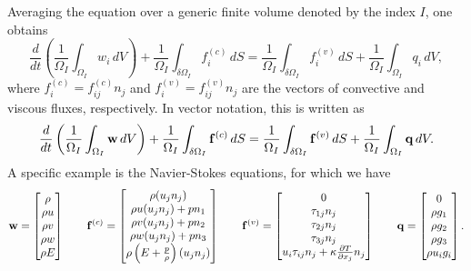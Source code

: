 \documentclass[oneside,a4paper,11pt]{report}
\begin{document}
Averaging the equation over a generic finite volume denoted by the index $I$, one obtains
\begin{equation}
\frac{d}{d t} \left ( \frac{1}{\Omega_I} \int_{\Omega_I} w_i \, dV \right)+  \frac{1}{\Omega_I} \int_{\delta \Omega_I} f^{(c)}_i \,dS = \frac{1}{\Omega_I} \int_{\delta \Omega_I} f^{(v)}_i \, dS + \frac{1}{\Omega_I} \int_{\Omega_I} q_i \,dV,
\end{equation}
where $f^{(c)}_i = f^{(c)}_{ij} n_j$ and $f^{(v)}_i = f^{(v)}_{ij} n_j$ are the vectors of convective and viscous fluxes, respectively. In vector notation, this is written as
\begin{equation}
\frac{d }{d t} \left ( \frac{1}{\Omega_I} \int_{\Omega_I} \mathbf{w} \,dV \right) +  \frac{1}{\Omega_I} \int_{\delta \Omega_I} \mathbf{f}^{(c)} \,dS = \frac{1}{\Omega_I} \int_{\delta \Omega_I} \mathbf{f}^{(v)} \, dS + \frac{1}{\Omega_I} \int_{\Omega_I} \mathbf{q} \,dV.
\end{equation}
A specific example is the Navier-Stokes equations, for which we have
\begin{equation}
\mathbf{w} = \begin{bmatrix} \rho \\ \rho u \\ \rho v \\ \rho w \\ \rho E \end{bmatrix}  \qquad
\mathbf{f}^{(c)} = \begin{bmatrix} \rho (u_j n_j) \\ \rho u (u_j n_j) + p n_1 \\ \rho v (u_j n_j) + p n_2 \\ \rho w (u_j n_j) + p n_3 \\ \rho \left (E + \frac{p}{\rho} \right) (u_j n_j) \end{bmatrix} \qquad
\mathbf{f}^{(v)} = \begin{bmatrix} 0 \\ \tau_{1j}n_j \\ \tau_{2j}n_j \\ \tau_{3j}n_j \\ u_i \tau_{ij}n_j +  \kappa \frac{\partial T}{\partial x_j} n_j \end{bmatrix} \qquad
\mathbf{q} = \begin{bmatrix} 0 \\ \rho g_1 \\ \rho g_2 \\ \rho g_3 \\  \rho u_i g_i \end{bmatrix}.
\end{equation} 
\end{document}
